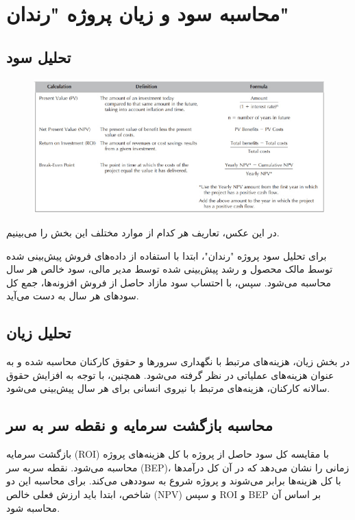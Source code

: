 \section{محاسبه سود و زیان پروژه "رندان"}
\subsection{تحلیل سود}

\begin{figure}[H]
	\centering
	\includegraphics{pic1.jpg}
	
	\label{fig:label4}
\end{figure}

در این عکس، تعاریف هر کدام از موارد مختلف این بخش را می‌بینیم.

برای تحلیل سود پروژه "رندان"، ابتدا با استفاده از داده‌های فروش پیش‌بینی شده توسط مالک محصول و رشد پیش‌بینی شده توسط مدیر مالی، سود خالص هر سال محاسبه می‌شود. سپس، با احتساب سود مازاد حاصل از فروش افزونه‌ها، جمع کل سودهای هر سال به دست می‌آید.

\subsection{تحلیل زیان}
در بخش زیان، هزینه‌های مرتبط با نگهداری سرورها و حقوق کارکنان محاسبه شده و به عنوان هزینه‌های عملیاتی در نظر گرفته می‌شود. همچنین، با توجه به افزایش حقوق سالانه کارکنان، هزینه‌های مرتبط با نیروی انسانی برای هر سال پیش‌بینی می‌شود.

\subsection{محاسبه بازگشت سرمایه و نقطه سر به سر}
بازگشت سرمایه (ROI) با مقایسه کل سود حاصل از پروژه با کل هزینه‌های پروژه محاسبه می‌شود. نقطه سربه سر (BEP)، زمانی را نشان می‌دهد که در آن کل درآمدها با کل هزینه‌ها برابر می‌شوند و پروژه شروع به سوددهی می‌کند. برای محاسبه این دو شاخص، ابتدا باید ارزش فعلی خالص (NPV) و سپس ROI و BEP بر اساس آن محاسبه شود.

